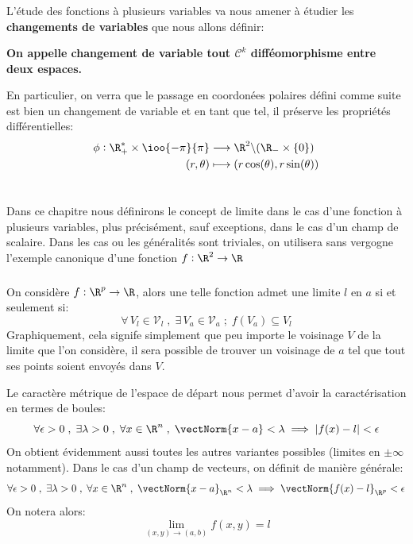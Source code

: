 \subsection*{}
L'étude des fonctions à plusieurs variables va nous amener à étudier les \textbf{changements de variables} que nous allons définir:
\begin{center}
   \textbf{On appelle changement de variable tout \(\mathcal{C}^k\) difféomorphisme entre deux espaces.}
\end{center}
En particulier, on verra que le passage en coordonées polaires défini comme suite est bien un changement de variable et en tant que tel, il préserve les propriétés différentielles:
\[
   \begin{aligned}
      \phi : \R_+^* \times \ioo{-\pi}{\pi} &\longrightarrow \R^2 \backslash (\R_- \times \{0\})\\
      (r, \theta) &\longmapsto (r\cos(\theta), r\sin(\theta))
   \end{aligned}
\]

\chapter*{}
Dans ce chapitre nous définirons le concept de limite dans le cas d'une fonction à plusieurs variables, plus précisément, sauf exceptions, dans le cas d'un champ de scalaire. Dans les cas ou les généralités sont triviales, on utilisera sans vergogne l'exemple canonique d'une fonction \(f : \R^2 \rightarrow \R\)

\subsection*{}
On considère \(f : \R^p \rightarrow \R\), alors une telle fonction admet une limite \(l\) en \(a\) si et seulement si:
\[
   \forall\, V_l \in \mathscr{V}_l \; , \; \exists\, V_a \in \mathscr{V}_a \; ; \; f(V_a) \subseteq V_l
\]
Graphiquement, cela signife simplement que peu importe le voisinage \(V\) de la limite que l'on considère,
il sera possible de trouver un voisinage de \(a\) tel que tout ses points soient envoyés dans \(V\).\<

Le caractère métrique de l'espace de départ nous permet d'avoir la caractérisation en termes de boules:
\[
   \forall \epsilon >0 \; , \; \exists \lambda > 0 \; , \; \forall x \in \R^n \; , \; \vectNorm{x - a} < \lambda \implies |f(x) - l| < \epsilon
\]
On obtient évidemment aussi toutes les autres variantes possibles (limites en \(\pm \infty\) notamment). Dans le cas d'un champ de vecteurs, on définit de manière générale:
\[
   \forall \epsilon >0 \; , \; \exists \lambda > 0 \; , \; \forall x \in \R^n \; , \; \vectNorm{x - a}_{\R^n} < \lambda \implies \vectNorm{f(x) - l}_{\R^p} < \epsilon
\]
On notera alors:
\[
   \lim_{(x, y) \rightarrow (a, b)} f(x, y) = l
\]

